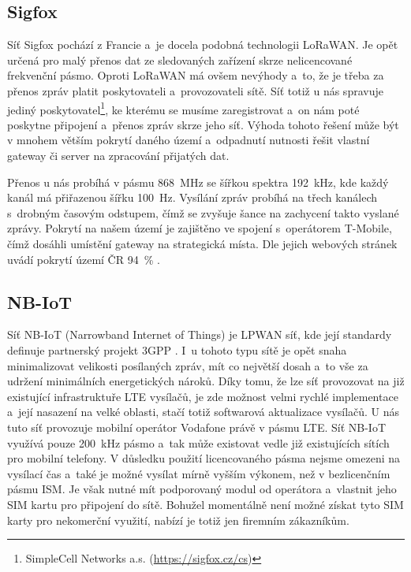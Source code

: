 \subsection{Sigfox}

Síť Sigfox pochází z Francie a~je docela podobná technologii LoRaWAN. Je opět určená pro malý přenos dat ze sledovaných zařízení skrze nelicencované frekvenční pásmo. Oproti LoRaWAN má ovšem nevýhody a~to, že je třeba za přenos zpráv platit poskytovateli a~provozovateli sítě. Síť totiž u nás spravuje jediný poskytovatel\footnote{SimpleCell Networks a.s. (\url{https://sigfox.cz/cs})}, ke kterému se musíme zaregistrovat a~on nám poté poskytne připojení a~přenos zpráv skrze jeho síť. Výhoda tohoto řešení může být v mnohem větším pokrytí daného území a~odpadnutí nutnosti řešit vlastní gateway či server na zpracování přijatých dat.

Přenos u nás probíhá v pásmu \SI{868}{\mega\hertz} se šířkou spektra \SI{192}{\kilo\hertz}, kde každý kanál má přiřazenou šířku \SI{100}{\hertz}. Vysílání zpráv probíhá na třech kanálech s~drobným časovým odstupem, čímž se zvyšuje šance na zachycení takto vyslané zprávy. Pokrytí na našem území je zajištěno ve spojení s~operátorem T-Mobile, čímž dosáhli umístění gateway na strategická místa. Dle jejich webových stránek uvádí pokrytí území ČR \SI{94}{\percent} \cite{Sigfox_pokryti}.

\subsection{NB-IoT}

Síť NB-IoT (Narrowband Internet of Things) je LPWAN síť, kde její standardy definuje partnerský projekt 3GPP \cite{3GPP}. I~u tohoto typu sítě je opět snaha minimalizovat velikosti posílaných zpráv, mít co největší dosah a~to vše za udržení minimálních energetických nároků. Díky tomu, že lze síť provozovat na již existující infrastruktuře LTE vysílačů, je zde možnost velmi rychlé implementace a~její nasazení na velké oblasti, stačí totiž softwarová aktualizace vysílačů. U nás tuto síť provozuje mobilní operátor Vodafone právě v pásmu LTE. Síť NB-IoT využívá pouze \SI{200}{\kilo\hertz} pásmo a~tak může existovat vedle již existujících sítích pro mobilní telefony. V důsledku použití licencovaného pásma nejsme omezeni na vysílací čas a~také je možné vysílat mírně vyšším výkonem, než v bezlicenčním pásmu ISM. Je však nutné mít podporovaný modul od operátora a~vlastnit jeho SIM kartu pro připojení do sítě. Bohužel momentálně není možné získat tyto SIM karty pro nekomerční využití, nabízí je totiž jen firemním zákazníkům. 


